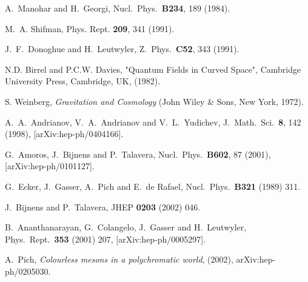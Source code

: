 \begin{thebibliography}{10}
  A.~Manohar and H.~Georgi,
  Nucl.\ Phys.\ {\bf B234}, 189 (1984).



M.~A. Shifman,
\newblock Phys. Rept. {\bf 209}, 341 (1991).



  J.~F.~Donoghue and H.~Leutwyler,
  Z.\ Phys.\ {\bf C52}, 343 (1991).


N.D. Birrel and P.C.W. Davies, "Quantum Fields in Curved Space", Cambridge University Press, Cambridge, UK, (1982). 


S. Weinberg, {\it Gravitation and Cosmology} (John Wiley \& Sons, New York, 1972).



  A.~A.~Andrianov, V.~A.~Andrianov and V.~L.~Yudichev,
  J.\ Math.\ Sci.\  {\bf 8}, 142 (1998),
  [arXiv:hep-ph/0404166].


  G.~Amoros, J.~Bijnens and P.~Talavera,
  Nucl.\ Phys.\ {\bf B602}, 87 (2001),
  [arXiv:hep-ph/0101127].


G.~Ecker, J.~Gasser, A.~Pich and E.~de Rafael,
Nucl.\ Phys.\ {\bf B321} (1989) 311.

J.~Bijnens and P.~Talavera,
JHEP {\bf 0203} (2002) 046.

B.~Ananthanarayan, G.~Colangelo, J.~Gasser and H.~Leutwyler,
Phys.\ Rept.\  {\bf 353} (2001) 207, [arXiv:hep-ph/0005297].


  A.~Pich, {\it Colourless mesons in a polychromatic world}, (2002),
  arXiv:hep-ph/0205030.



\end{thebibliography}
